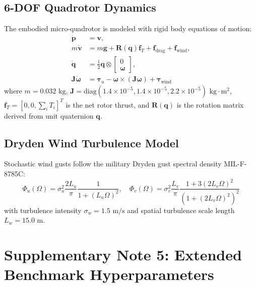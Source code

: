 \documentclass[10pt,letterpaper]{article}
\begin{document}
\subsection{6-DOF Quadrotor Dynamics}
The embodied micro-quadrotor is modeled with rigid body equations of motion:
\begin{align}
\dot{\mathbf{p}} &= \mathbf{v}, \\
m \dot{\mathbf{v}} &= m \mathbf{g} + \mathbf{R}(\mathbf{q}) \mathbf{f}_T + \mathbf{f}_{\mathrm{drag}} + \mathbf{f}_{\mathrm{wind}}, \\
\dot{\mathbf{q}} &= \frac{1}{2} \mathbf{q} \otimes \begin{bmatrix} 0 \\ \boldsymbol{\omega} \end{bmatrix}, \\
\mathbf{J} \dot{\boldsymbol{\omega}} &= \boldsymbol{\tau}_u - \boldsymbol{\omega} \times (\mathbf{J} \boldsymbol{\omega}) + \boldsymbol{\tau}_{\mathrm{wind}}
\end{align}
where $m = 0.032\text{ kg}$, $\mathbf{J} = \mathrm{diag}(1.4\times 10^{-5}, 1.4\times 10^{-5}, 2.2\times 10^{-5})\text{ kg}\cdot\text{m}^2$, $\mathbf{f}_T = [0, 0, \sum_i T_i]^T$ is the net rotor thrust, and $\mathbf{R}(\mathbf{q})$ is the rotation matrix derived from unit quaternion $\mathbf{q}$.

\subsection{Dryden Wind Turbulence Model}
Stochastic wind gusts follow the military Dryden gust spectral density MIL-F-8785C:
\begin{equation}
\Phi_u(\Omega) = \sigma_u^2 \frac{2 L_u}{\pi} \frac{1}{1 + (L_u \Omega)^2}, \quad \Phi_v(\Omega) = \sigma_v^2 \frac{L_v}{\pi} \frac{1 + 3(2 L_v \Omega)^2}{(1 + (2 L_v \Omega)^2)^2}
\end{equation}
with turbulence intensity $\sigma_w = 1.5\text{ m/s}$ and spatial turbulence scale length $L_w = 15.0\text{ m}$.

\newpage

\section{Supplementary Note 5: Extended Benchmark Hyperparameters}
\end{document}
